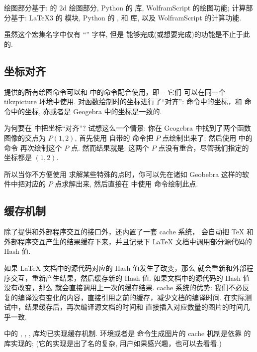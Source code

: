 \documentclass[
  hyper, lang=cn, 
  class=l3dox, 
]{../../zlatex/code/ztex}
\begin{document}
绘图部分基于: \TikZ{} 的 2d 绘图部分,%
Python 的  库, WolframScript 的绘图功能; 计算部分基于: \LaTeX3 的  模块, Python 
的 ,  和  库, 以及 WolframScript 的计算功能. 

虽然这个宏集名字中仅有 ``\TikZ{}'' 字样, 但是 \ztikz{} 能够完成(或想要完成)的功能是不止于此的.


\subsection{坐标对齐}
\zTikZ{} 提供的所有绘图命令可以和 \TikZ{} 中的命令配合使用，即 -- 它们
可以在同一个 {tikzpicture} 环境中使用. \zTikZ{} 对函数绘制时的坐标进行了``对齐'':
\zTikZ{} 命令中的坐标，和 \TikZ{} 命令中的坐标, 亦或者是 Geogebra 中的坐标是一致的. 

为何要在 \zTikZ{} 中把坐标``对齐''? 试想这么一个情景: 你在 Geogebra 中找到了两个函数图像的交点为 $P(1, 2)$,
首先使用 \TikZ{} 自带的 \cmd{\filldraw} 命令把 $P$ 点绘制出来了; 然后使用 \zTikZ{} 中的 \cmd{\ShowPoint} 命令
再次绘制这个 $P$ 点. 然而结果就是: 这两个 $P$ 点没有重合，尽管我们指定的坐标都是 $(1, 2)$.

所以当你不方便使用 \zTikZ{} 求解某些特殊的点时，你可以先在诸如 Geobebra 这样的软件中把对应的 $P$ 
点求解出来, 然后直接在 \zTikZ{} 中使用 \cmd{\ShowPoint} 命令绘制此点.


\subsection{缓存机制}
\zTikZ{} 除了提供和外部程序交互的接口外，还内置了一套 cache 系统，\zTikZ{} 会自动把 \TeX{} 和
外部程序交互产生的结果缓存下来，并且记录下 \LaTeX{} 文档中调用部分源代码的 Hash 值. 

如果 \LaTeX{} 文档中的源代码对应的 Hash 值发生了改变，那么 \zTikZ{} 就会重新和外部程序交互，重新产生结果，然后缓存新的 Hash 值.
如果文档中的源代码的 Hash 值没有改变，那么 \zTikZ{} 就会直接调用上一次的缓存结果. cache 系统的优势:
我们不必反复的编译没有变化的内容，直接引用之前的缓存，减少文档的编译时间. 在实际测试中，结果缓存后，再次编译源文档的时间和
直接插入对应数量的图片的时间几乎一致.

\zTikZ{} 中的 , , ,  库均已实现缓存机制. 
 环境或者是 \cmd{\tikz} 命令生成图片的 cache 机制是依靠 \TikZ{} 的  
库实现的; (它的实现是出了名的复杂, 用户如果感兴趣，也可以去看看.)
\end{document}
